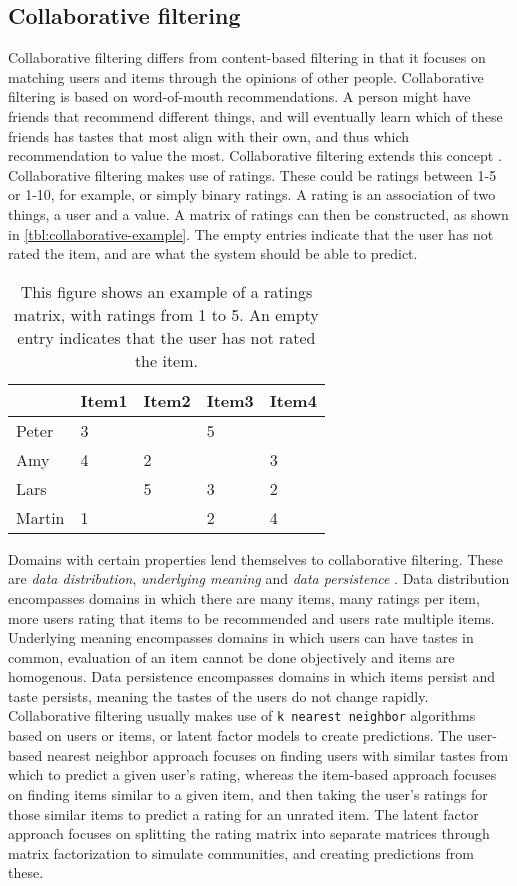 \subsection{Collaborative filtering}
Collaborative filtering differs from content-based filtering in that it focuses on matching users and items through the opinions of other people.
Collaborative filtering is based on word-of-mouth recommendations.
A person might have friends that recommend different things, and will eventually learn which of these friends has tastes that most align with their own, and thus which recommendation to value the most.
Collaborative filtering extends this concept \cite{CollaborativeFiltering}.
Collaborative filtering makes use of ratings.
These could be ratings between 1-5 or 1-10, for example, or simply binary ratings.
A rating is an association of two things, a user and a value.
A matrix of ratings can then be constructed, as shown in \autoref{tbl:collaborative-example}.
The empty entries indicate that the user has not rated the item, and are what the system should be able to predict.
\begin{table}[H]
    \centering
    \begin{tabular}{|l|l|l|l|l|}
    \hline
           & Item1 & Item2 & Item3 & Item4 \\ \hline
    Peter  & 3     &       & 5     &       \\ \hline
    Amy    & 4     & 2     &       & 3     \\ \hline
    Lars   &       & 5     & 3     & 2     \\ \hline
    Martin & 1     &       & 2     & 4     \\ \hline
    \end{tabular}
    \caption{This figure shows an example of a ratings matrix, with ratings from 1 to 5. An empty entry indicates that the user has not rated the item.}
    \label{tbl:collaborative-example}
\end{table}
\noindent
Domains with certain properties lend themselves to collaborative filtering. 
These are \textit{data distribution}, \textit{underlying meaning} and \textit{data persistence} \cite{CollaborativeFiltering}.
Data distribution encompasses domains in which there are many items, many ratings per item, more users rating that items to be recommended and users rate multiple items.
Underlying meaning encompasses domains in which users can have tastes in common, evaluation of an item cannot be done objectively and items are homogenous.
Data persistence encompasses domains in which items persist and taste persists, meaning the tastes of the users do not change rapidly.
Collaborative filtering usually makes use of \texttt{k nearest neighbor} algorithms based on users or items, or latent factor models to create predictions.
The user-based nearest neighbor approach focuses on finding users with similar tastes from which to predict a given user's rating, whereas the item-based approach focuses on finding items similar to a given item, and then taking the user's ratings for those similar items to predict a rating for an unrated item.
The latent factor approach focuses on splitting the rating matrix into separate matrices through matrix factorization to simulate communities, and creating predictions from these.


